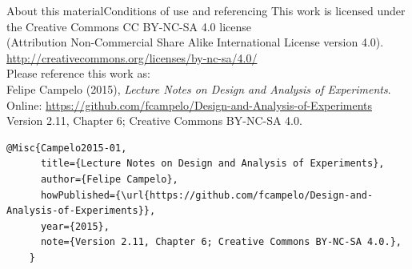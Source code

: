 \documentclass[t]{beamer}
\begin{document}

\begin{ftstf}{About this material}{Conditions of use and referencing}
\centering\footnotesize This work is licensed under the Creative Commons CC BY-NC-SA 4.0 license\\(Attribution Non-Commercial Share Alike International License version 4.0).\\
\vhalf
\url{http://creativecommons.org/licenses/by-nc-sa/4.0/}\\
\vone
\footnotesize Please reference this work as:\\
\footnotesize \flushleft Felipe Campelo (2015), \textit{Lecture Notes on Design and Analysis of Experiments}.\\Online: {\scriptsize\url{https://github.com/fcampelo/Design-and-Analysis-of-Experiments}}\\
Version 2.11, Chapter 6; Creative Commons BY-NC-SA 4.0.\\

\begin{Verbatim}[fontsize=\tiny]
    @Misc{Campelo2015-01,
      title={Lecture Notes on Design and Analysis of Experiments},
      author={Felipe Campelo},
      howPublished={\url{https://github.com/fcampelo/Design-and-Analysis-of-Experiments}},
      year={2015},
      note={Version 2.11, Chapter 6; Creative Commons BY-NC-SA 4.0.},
    }
\end{Verbatim}

\end{ftstf}
\end{document}
